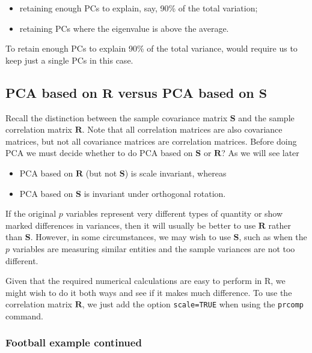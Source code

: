 \documentclass[
]{book}
\providecommand{\tightlist}{%
  \setlength{\itemsep}{0pt}\setlength{\parskip}{0pt}}
\theoremstyle{definition}
\theoremstyle{definition}
\theoremstyle{definition}
\theoremstyle{definition}
\theoremstyle{remark}
\begin{document}
\begin{itemize}
\tightlist
\item
  retaining enough PCs to explain, say, 90\% of the total variation;
\item
  retaining PCs where the eigenvalue is above the average.
\end{itemize}

To retain enough PCs to explain 90\% of the total variance, would require us to keep just a single PCs in this case.

\hypertarget{pcawithR}{%
\subsection{\texorpdfstring{PCA based on \(\mathbf R\) versus PCA based on \(\mathbf S\)}{PCA based on \textbackslash mathbf R versus PCA based on \textbackslash mathbf S}}\label{pcawithR}}

Recall the distinction between the sample covariance matrix \(\mathbf S\) and the sample correlation matrix \(\mathbf R\).
Note that all correlation matrices are also covariance matrices, but not all covariance matrices are correlation matrices.
Before doing PCA we must decide whether to do PCA based on \(\mathbf S\) or \(\mathbf R\)? As we will see later

\begin{itemize}
\tightlist
\item
  PCA based on \(\mathbf R\) (but not \(\mathbf S\)) is scale invariant, whereas
\item
  PCA based on \(\mathbf S\) is invariant under orthogonal rotation.
\end{itemize}

If the original \(p\) variables represent very different types of quantity or show marked differences in variances, then it will usually be better to use \(\mathbf R\) rather than \(\mathbf S\). However, in some circumstances, we may wish to use \(\mathbf S\), such as when the \(p\) variables are measuring similar entities and the sample variances are not too different.

Given that the required numerical calculations are easy to perform in R, we might wish to do it both ways and see if it makes much difference. To use the correlation matrix \(\mathbf R\), we just add the option \texttt{scale=TRUE} when using the \texttt{prcomp} command.

\hypertarget{football-example-continued}{%
\subsubsection{Football example continued}\label{football-example-continued}}
\end{document}
